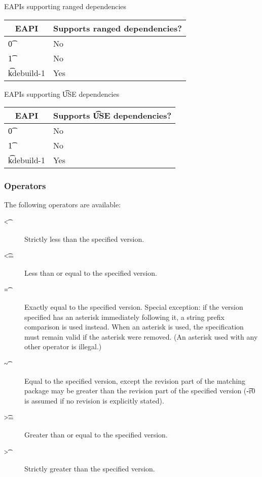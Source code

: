 \IFKDEBUILDELSE
{
    \begin{centertable}{EAPIs supporting ranged dependencies} \label{range-deps-table}
    \begin{tabular}{ l l }
        \toprule
        \multicolumn{1}{c}{\textbf{EAPI}} &
        \multicolumn{1}{c}{\textbf{Supports ranged dependencies?}} \\
        \midrule
    \t{0} & No \\
    \t{1} & No \\
    \t{kdebuild-1} & Yes \\
    \bottomrule
    \end{tabular}
    \end{centertable}

    \begin{centertable}{EAPIs supporting \t{USE} dependencies} \label{use-deps-table}
    \begin{tabular}{ l l }
        \toprule
        \multicolumn{1}{c}{\textbf{EAPI}} &
        \multicolumn{1}{c}{\textbf{Supports \t{USE} dependencies?}} \\
        \midrule
    \t{0} & No \\
    \t{1} & No \\
    \t{kdebuild-1} & Yes \\
    \bottomrule
    \end{tabular}
    \end{centertable}
}{
}

\subsubsection{Operators}
\label{dep-operator}

The following operators are available:

\begin{description}
\item[\t{<}] Strictly less than the specified version.
\item[\t{<=}] Less than or equal to the specified version.
\item[\t{=}] Exactly equal to the specified version. Special exception: if the version
    specified has an asterisk immediately following it, a string prefix comparison is
    used instead. When an asterisk is used, the specification must remain valid if the
    asterisk were removed. (An asterisk used with any other operator is illegal.)
\item[\t{\~}] Equal to the specified version, except the revision part of the matching
    package may be greater than the revision part of the specified version (\t{-r0} is
    assumed if no revision is explicitly stated).
\item[\t{>=}] Greater than or equal to the specified version.
\item[\t{>}] Strictly greater than the specified version.
\end{description}

